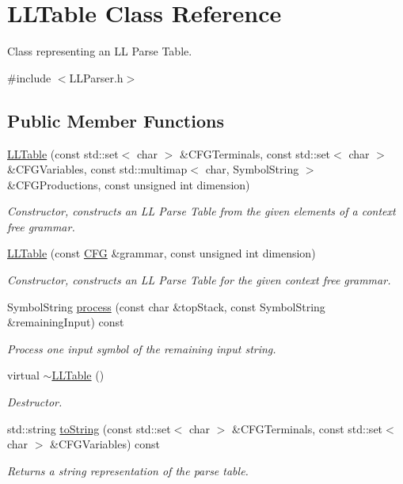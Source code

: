 \hypertarget{class_l_l_table}{\section{L\-L\-Table Class Reference}
\label{class_l_l_table}
}


Class representing an L\-L Parse Table.  




{\ttfamily \#include $<$L\-L\-Parser.\-h$>$}

\subsection*{Public Member Functions}
\begin{DoxyCompactItemize}
\item 
\hyperlink{class_l_l_table_a6c4e8032c91212be9d5b4cf22fc69c0d}{L\-L\-Table} (const std\-::set$<$ char $>$ \&C\-F\-G\-Terminals, const std\-::set$<$ char $>$ \&C\-F\-G\-Variables, const std\-::multimap$<$ char, Symbol\-String $>$ \&C\-F\-G\-Productions, const unsigned int dimension)
\begin{DoxyCompactList}\small\item\em Constructor, constructs an L\-L Parse Table from the given elements of a context free grammar. \end{DoxyCompactList}\item 
\hyperlink{class_l_l_table_a4aacfa72d10dcbcba22d42e08408ba91}{L\-L\-Table} (const \hyperlink{class_c_f_g}{C\-F\-G} \&grammar, const unsigned int dimension)
\begin{DoxyCompactList}\small\item\em Constructor, constructs an L\-L Parse Table for the given context free grammar. \end{DoxyCompactList}\item 
Symbol\-String \hyperlink{class_l_l_table_a403059b89fd2f82f2b4d83cca658ef08}{process} (const char \&top\-Stack, const Symbol\-String \&remaining\-Input) const 
\begin{DoxyCompactList}\small\item\em Process one input symbol of the remaining input string. \end{DoxyCompactList}\item 
\hypertarget{class_l_l_table_a37eed818542510ffc9ce790d2c7e7e84}{virtual \hyperlink{class_l_l_table_a37eed818542510ffc9ce790d2c7e7e84}{$\sim$\-L\-L\-Table} ()}\label{class_l_l_table_a37eed818542510ffc9ce790d2c7e7e84}

\begin{DoxyCompactList}\small\item\em Destructor. \end{DoxyCompactList}\item 
std\-::string \hyperlink{class_l_l_table_a01eaf21e0fefb3978d7276b082dba225}{to\-String} (const std\-::set$<$ char $>$ \&C\-F\-G\-Terminals, const std\-::set$<$ char $>$ \&C\-F\-G\-Variables) const 
\begin{DoxyCompactList}\small\item\em Returns a string representation of the parse table. \end{DoxyCompactList}\end{DoxyCompactItemize}
